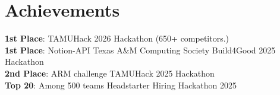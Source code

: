 \documentclass[letterpaper,10pt]{article}
\begin{document}
\section{Achievements}
\begin{itemize}[leftmargin=0.15in, label={}]
   \small{\item{
    \textbf{1st Place}{: TAMUHack 2026 Hackathon (650+ competitors.)} \\
    \textbf{1st Place}{: Notion-API Texas A\&M Computing Society Build4Good 2025 Hackathon} \\
    \textbf{2nd Place}{: ARM challenge TAMUHack 2025 Hackathon} \\
    \textbf{Top 20}{: Among 500 teams Headstarter Hiring Hackathon 2025} \\
   }}
 \end{itemize}
\end{document}
